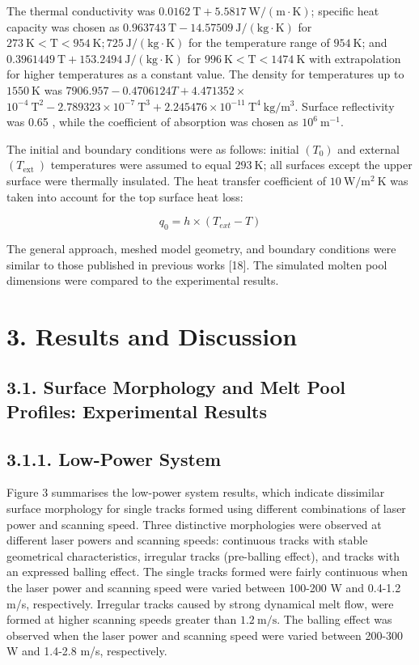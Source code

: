 \documentclass[10pt]{article}
\begin{document}
The thermal conductivity was $0.0162 \mathrm{~T}+5.5817 \mathrm{~W} /(\mathrm{m} \cdot \mathrm{K})$; specific heat capacity was chosen as $0.963743 \mathrm{~T}-14.57509 \mathrm{~J} /(\mathrm{kg} \cdot \mathrm{K})$ for $273 \mathrm{~K}<\mathrm{T}<954 \mathrm{~K} ; 725 \mathrm{~J} /(\mathrm{kg} \cdot \mathrm{K})$ for the temperature range of $954 \mathrm{~K}$; and $0.3961449 \mathrm{~T}+153.2494 \mathrm{~J} /(\mathrm{kg} \cdot \mathrm{K})$ for $996 \mathrm{~K}<\mathrm{T}<1474 \mathrm{~K}$ with extrapolation for higher temperatures as a constant value. The density for temperatures up to $1550 \mathrm{~K}$ was $7906.957-0.4706124 T+4.471352 \times$ $10^{-4} \mathrm{~T}^{2}-2.789323 \times 10^{-7} \mathrm{~T}^{3}+2.245476 \times 10^{-11} \mathrm{~T}^{4} \mathrm{~kg} / \mathrm{m}^{3}$. Surface reflectivity was 0.65 , while the coefficient of absorption was chosen as $10^{6} \mathrm{~m}^{-1}$.

The initial and boundary conditions were as follows: initial $\left(T_{0}\right)$ and external $\left(T_{\text {ext }}\right)$ temperatures were assumed to equal $293 \mathrm{~K}$; all surfaces except the upper surface were thermally insulated. The heat transfer coefficient of $10 \mathrm{~W} / \mathrm{m}^{2} \mathrm{~K}$ was taken into account for the top surface heat loss:


\begin{equation*}
q_{0}=h \times\left(T_{e x t}-T\right) \tag{3}
\end{equation*}


The general approach, meshed model geometry, and boundary conditions were similar to those published in previous works [18]. The simulated molten pool dimensions were compared to the experimental results.

\section*{3. Results and Discussion}
\subsection*{3.1. Surface Morphology and Melt Pool Profiles: Experimental Results}
\subsection*{3.1.1. Low-Power System}
Figure 3 summarises the low-power system results, which indicate dissimilar surface morphology for single tracks formed using different combinations of laser power and scanning speed. Three distinctive morphologies were observed at different laser powers and scanning speeds: continuous tracks with stable geometrical characteristics, irregular tracks (pre-balling effect), and tracks with an expressed balling effect. The single tracks formed were fairly continuous when the laser power and scanning speed were varied between 100-200 W and 0.4-1.2 m/s, respectively. Irregular tracks caused by strong dynamical melt flow, were formed at higher scanning speeds greater than $1.2 \mathrm{~m} / \mathrm{s}$. The balling effect was observed when the laser power and scanning speed were varied between 200-300 W and 1.4-2.8 m/s, respectively.
\end{document}
